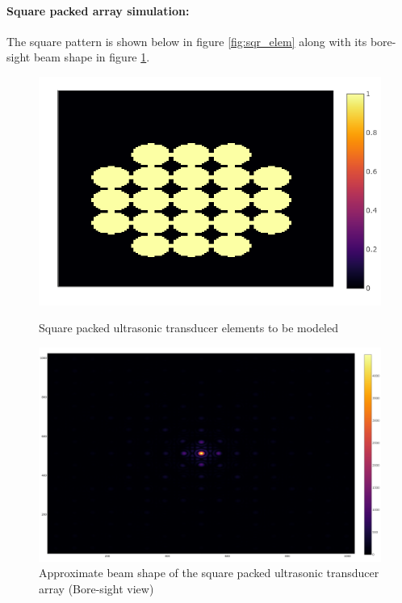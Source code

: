 \paragraph{Square packed array simulation:}
The square pattern is shown below in figure \ref{fig:sqr_elem} along with its bore-sight beam shape in figure \ref{fig:sqr_elem_topBeam}.
\begin{figure}[h!]
\centering

    \begin{minipage}{0.4\textwidth}
    \centering
    \includegraphics[width= \textwidth]{Figures/arraySim/sqr/arraylayoutcircular.png}
    \caption{Square packed ultrasonic transducer elements to be modeled}
    \label{fig:sqr_elem}
    \end{minipage}\hfill
    \begin{minipage}{0.4\textwidth}
    \centering
    \includegraphics[width= \textwidth]{Figures/arraySim/sqr/circ_sqr_beamTop.png}
    \caption{Approximate beam shape of the square packed ultrasonic transducer array (Bore-sight view)}
    \label{fig:sqr_elem_topBeam}
    \end{minipage}
    
\end{figure}


